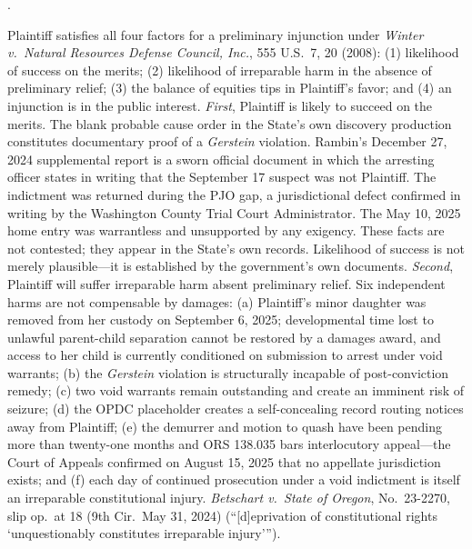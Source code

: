 \documentclass[12pt,letterpaper]{article}
\newcounter{complaintpara}
\newenvironment{paras}{%
	\begin{list}{\arabic{complaintpara}.}{%
			\setlength{\leftmargin}{0.5in}%
			\setlength{\labelwidth}{0.4in}%
			\setlength{\labelsep}{0.1in}%
			\setlength{\itemsep}{0pt}%
			\setlength{\parsep}{0pt}%
			\setlength{\topsep}{6pt}%
		}%
	}{%
	\end{list}%
}
\begin{document}
\begin{paras}
		\item Plaintiff satisfies all four factors for a preliminary injunction under \textit{Winter v.\ Natural Resources Defense Council, Inc.}, 555 U.S.\ 7, 20 (2008): (1) likelihood of success on the merits; (2) likelihood of irreparable harm in the absence of preliminary relief; (3) the balance of equities tips in Plaintiff's favor; and (4) an injunction is in the public interest.
		\textit{First}, Plaintiff is likely to succeed on the merits. The blank probable cause order in the State's own discovery production constitutes documentary proof of a \textit{Gerstein} violation. Rambin's December 27, 2024 supplemental report is a sworn official document in which the arresting officer states in writing that the September 17 suspect was not Plaintiff. The indictment was returned during the PJO gap, a jurisdictional defect confirmed in writing by the Washington County Trial Court Administrator. The May 10, 2025 home entry was warrantless and unsupported by any exigency. These facts are not contested; they appear in the State's own records. Likelihood of success is not merely plausible---it is established by the government's own documents.
		\textit{Second}, Plaintiff will suffer irreparable harm absent preliminary relief. Six independent harms are not compensable by damages: (a) Plaintiff's minor daughter was removed from her custody on September 6, 2025; developmental time lost to unlawful parent-child separation cannot be restored by a damages award, and access to her child is currently conditioned on submission to arrest under void warrants; (b) the \textit{Gerstein} violation is structurally incapable of post-conviction remedy; (c) two void warrants remain outstanding and create an imminent risk of seizure; (d) the OPDC placeholder creates a self-concealing record routing notices away from Plaintiff; (e) the demurrer and motion to quash have been pending more than twenty-one months and ORS 138.035 bars interlocutory appeal---the Court of Appeals confirmed on August 15, 2025 that no appellate jurisdiction exists; and (f) each day of continued prosecution under a void indictment is itself an irreparable constitutional injury. \textit{Betschart v.\ State of Oregon}, No.\ 23-2270, slip op.\ at 18 (9th Cir.\ May 31, 2024) (``[d]eprivation of constitutional rights `unquestionably constitutes irreparable injury'\thinspace'').
		

\end{paras}
\end{document}

